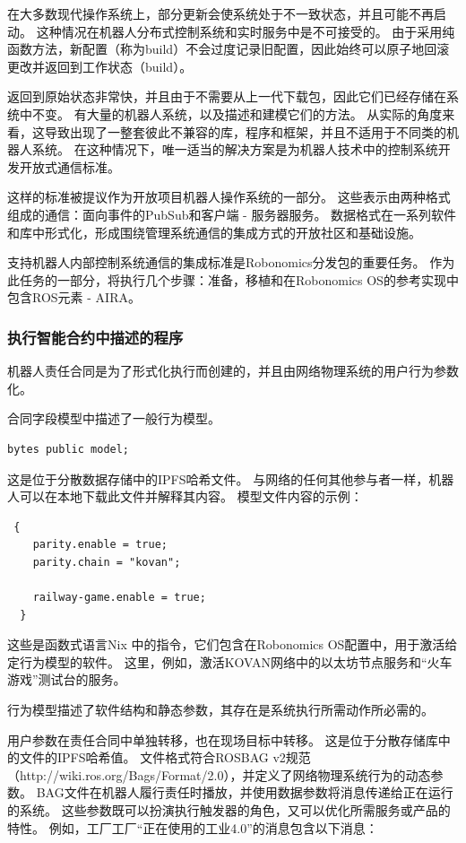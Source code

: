 \documentclass[UTF8]{article}
\begin{document}
在大多数现代操作系统上，部分更新会使系统处于不一致状态，并且可能不再启动。 这种情况在机器人分布式控制系统和实时服务中是不可接受的。 由于采用纯函数方法，新配置（称为build）不会过度记录旧配置，因此始终可以原子地回滚更改并返回到工作状态（build）。

返回到原始状态非常快，并且由于不需要从上一代下载包，因此它们已经存储在系统中不变。 有大量的机器人系统，以及描述和建模它们的方法。 从实际的角度来看，这导致出现了一整套彼此不兼容的库，程序和框架，并且不适用于不同类的机器人系统。 在这种情况下，唯一适当的解决方案是为机器人技术中的控制系统开发开放式通信标准。

这样的标准被提议作为开放项目机器人操作系统的一部分。 这些表示由两种格式组成的通信：面向事件的PubSub和客户端 - 服务器服务。 数据格式在一系列软件和库中形式化，形成围绕管理系统通信的集成方式的开放社区和基础设施。

支持机器人内部控制系统通信的集成标准是Robonomics分发包的重要任务。 作为此任务的一部分，将执行几个步骤：准备，移植和在Robonomics OS的参考实现中包含ROS元素 - AIRA。

\subsubsection{执行智能合约中描述的程序}

机器人责任合同是为了形式化执行而创建的，并且由网络物理系统的用户行为参数化。

合同字段模型中描述了一般行为模型。
\begin{lstlisting}
bytes public model;
\end{lstlisting}

这是位于分散数据存储中的IPFS哈希文件。 与网络的任何其他参与者一样，机器人可以在本地下载此文件并解释其内容。 模型文件内容的示例：

\begin{lstlisting}
 {
    parity.enable = true;
    parity.chain = "kovan";

    railway-game.enable = true;
  }
\end{lstlisting}

这些是函数式语言Nix \cite{Dolstra2010NixOS:Distribution}中的指令，它们包含在Robonomics OS配置中，用于激活给定行为模型的软件。 这里，例如，激活KOVAN网络中的以太坊节点服务和“火车游戏”测试台的服务。

行为模型描述了软件结构和静态参数，其存在是系统执行所需动作所必需的。

用户参数在责任合同中单独转移，也在现场目标中转移。 这是位于分散存储库中的文件的IPFS哈希值。 文件格式符合ROSBAG v2规范（http://wiki.ros.org/Bags/Format/2.0），并定义了网络物理系统行为的动态参数。 BAG文件在机器人履行责任时播放，并使用数据参数将消息传递给正在运行的系统。 这些参数既可以扮演执行触发器的角色，又可以优化所需服务或产品的特性。 例如，工厂工厂“正在使用的工业4.0”的消息包含以下消息：
\end{document}
